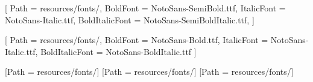 \RequirePackage{anyfontsize}
\RequirePackage[no-math]{fontspec}
	\setmainfont{NotoSans-Regular.ttf}[
		Path = resources/fonts/,
		BoldFont = {NotoSans-SemiBold.ttf},
		ItalicFont = {NotoSans-Italic.ttf},
		BoldItalicFont = {NotoSans-SemiBoldItalic.ttf},
	]
	
    [
        Path = resources/fonts/,
        BoldFont = {NotoSans-Bold.ttf},
        ItalicFont = {NotoSans-Italic.ttf},
        BoldItalicFont = {NotoSans-BoldItalic.ttf}
    ]
    
	[Path = resources/fonts/]
	[Path = resources/fonts/]
	[Path = resources/fonts/]


\renewcommand{\small}{\fontsize{10}{12}\selectfont}
\renewcommand{\normalsize}{\fontsize{11}{13.2}\selectfont}
\renewcommand{\large}{\fontsize{12}{14.4}\selectfont}
\renewcommand{\Large}{\fontsize{14}{16.8}\selectfont}
\renewcommand{\LARGE}{\fontsize{16}{19.2}\selectfont}
\renewcommand{\huge}{\fontsize{22}{26.4}\selectfont}
\renewcommand{\Huge}{\fontsize{28}{33.6}\selectfont}
\renewcommand{\HUGE}{\fontsize{40}{48}\selectfont}
\newcommand{\semihuge}{\fontsize{18}{21.6}\selectfont}
\newcommand{\semiHuge}{\fontsize{26}{31.2}\selectfont}
\newcommand{\EXHUGE}{\fontsize{108}{129.6}\selectfont}




\newcommand{\volumenumfont}{%
	\EXHUGE\fontsize{108}{129.6}\selectfont
}

\newcommand{\volumetitlefont}{%
	\linespread{.8}\HUGE\color{white}\titlefont
}

\newcommand{\volumeauthorfont}{%
	\huge\subtitlefont\color{white}
}

\newcommand{\chaptertitlefont}{%
	\huge\color{white}\titlefont
}

\newcommand{\chapternamefont}{%
	\semihuge\color{white}\subtitlefont
}

\newcommand{\chapterauthorfont}{%
	\LARGE\color{white}\subtitlefont
}

\newcommand{\sectiontitlefont}{%
	\huge\color{principal}\titlefont\scshape
}

\newcommand{\subsectiontitlefont}{%
	\Large\color{principal}\subtitlefont
}

\newcommand{\bannernamefont}{%
	\normalfont\large\bfseries\color{white}
}

\newcommand{\bannertitlefont}{%
   	\normalfont\normalsize\color\currentcolor\titlefont
}

\newcommand{\boxnamefont}{%
	\normalfont\large\bfseries\color{white}
}

\newcommand{\boxtitlefont}{%
  \normalfont\large\bfseries\color{\currentcolor}
}

\newcommand{\footerfont}{%
	\titlefont\large\color{white}	
}